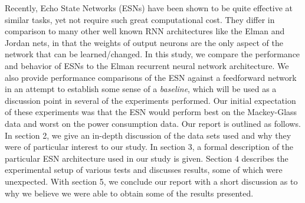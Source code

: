 \documentclass{acm_proc_article-sp}
\begin{document}
Recently, Echo State Networks (ESNs) have been shown to be quite effective at similar tasks, yet not require such great computational cost. They differ in comparison to many other well known RNN architectures like the Elman and Jordan nets, in that the weights of output neurons are the only aspect of the network that can be learned/changed. In this study, we compare the performance and behavior of ESNs to the Elman recurrent neural network architecture. We also provide performance comparisons of the ESN against a feedforward network in an attempt to establish some sense of a \emph{baseline}, which will be used as a discussion point in several of the experiments performed. Our initial expectation of these experiments was that the ESN would perform best on the Mackey-Glass data and worst on the power consumption data. Our report is outlined as follows. In section 2, we give an in-depth discussion of the data sets used and why they were of particular interest to our study. In section 3, a formal description of the particular ESN architecture used in our study is given. Section 4 describes the experimental setup of various tests and discusses results, some of which were unexpected. With section 5, we conclude our report with a short discussion as to why we believe we were able to obtain some of the results presented.
\end{document}
